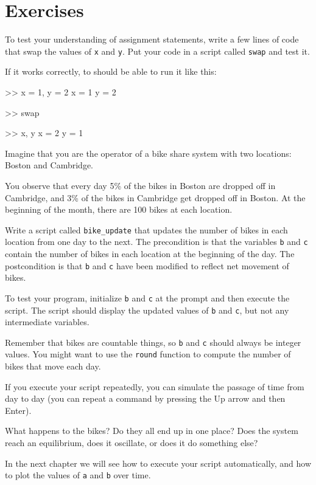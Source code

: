 \documentclass[main.tex]{subfiles}
\begin{document}
\section{Exercises}

\begin{ex}
To test your understanding of assignment statements, write a few lines of code that swap the values of {\tt x} and {\tt y}. 
Put your code in a script called {\tt swap} and test it.

If it works correctly, to should be able to run it like this:

\begin{code}
>> x = 1, y = 2
x = 1
y = 2

>> swap

>> x, y
x = 2
y = 1
\end{code}


\end{ex}


\begin{ex}
\label{bikegame}

Imagine that you are the operator of a bike share system with two
locations: Boston and Cambridge.

You observe that every day 5\%
of the bikes in Boston are dropped off in Cambridge, and 3\% of the bikes
in Cambridge get dropped off in Boston.
At the beginning of the month, there are 100 bikes at each location.

Write a script called \verb"bike_update" that updates the number
of bikes in each location from one day to the next.  The precondition
is that the variables {\tt b} and {\tt c} contain the number of bikes
in each location at the beginning of the day.  The postcondition
is that {\tt b} and {\tt c} have been modified to reflect net movement of bikes.

To test your program, initialize {\tt b} and {\tt c} at
the prompt and then execute the script.  The script should display
the updated values of {\tt b} and {\tt c}, but not any intermediate
variables.

Remember that bikes are countable things, so {\tt b} and {\tt c} should always be integer values.  You might want to use the {\tt round} function
to compute the number of bikes that move each day.

If you execute your script repeatedly, you can simulate the passage
of time from day to day (you can repeat a command by pressing the {\sf Up} arrow and then {\sf Enter}).

What happens to the bikes?  Do they all end up in one place?  Does the system reach an equilibrium, does it oscillate, or does it do something else?

In the next chapter we will see how to execute your script automatically,
and how to plot the values of {\tt a} and {\tt b} over time.
\end{ex}
\end{document}
